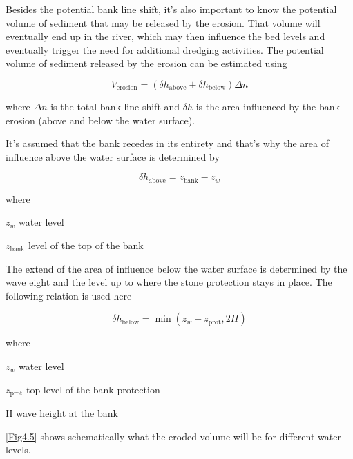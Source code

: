 Besides the potential bank line shift, it's also important to know the potential volume of sediment that may be released by the erosion.
That volume will eventually end up in the river, which may then influence the bed levels and eventually trigger the need for additional dredging activities.
The potential volume of sediment released by the erosion can be estimated using

\begin{equation}
V_\text{erosion} = ( \delta h_\text{above} + \delta h_\text{below} ) \Delta n
\end{equation}

where $\Delta n$ is the total bank line shift and $\delta h$ is the area influenced by the bank erosion (above and below the water surface).

It's assumed that the bank recedes in its entirety and that's why the area of influence above the water surface is determined by

\begin{equation}
\delta h_\text{above} = z_\text{bank} - z_w
\end{equation}

where

\begin{symbollist}
\item[$z_w$] water level 
\item[$z_\text{bank}$] level of the top of the bank 
\end{symbollist}

The extend of the area of influence below the water surface is determined by the wave eight and the level up to where the stone protection stays in place.
The following relation is used here

\begin{equation}
\delta h_\text{below} = \min ( z_w - z_\text{prot}, 2 H )
\end{equation}

where

\begin{symbollist}
\item{$z_w$} water level 
\item{$z_\text{prot}$} top level of the bank protection 
\item{H} wave height at the bank 
\end{symbollist}

\autoref{Fig4.5} shows schematically what the eroded volume will be for different water levels.

